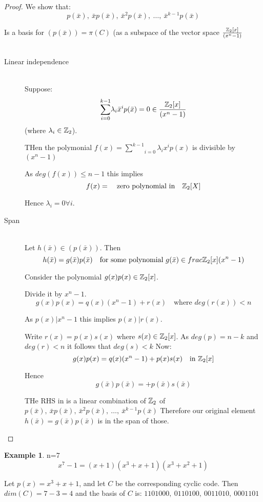 \documentclass[]{article}
\theoremstyle{definition}
\newtheorem*{exmp}{Example}
\theoremstyle{remark}
\numberwithin{equation}{section}
\begin{document}
			\begin{proof}
				We show that:
				\[
					p(\bar{x}),\ \bar{x}p(\bar{x}),\ \bar{x}^2p(\bar{x}),\ \hdots,\ \bar{x}^{k-1}p(\bar{x})
				\]

				Is a basis for $\left( p(\bar{x})\right) = \pi(C)$ (as a subspace of the vector space $\frac{\mathbb{Z}_2[x]}{(x^n-1)}$\\
				\\
				\begin{description}
					\item[Linear independence]\hfill\\
						Suppose:
						\[
							\underset{i=0}{\overset{k-1}{\sum}} \lambda_i \bar{x}^i p(\bar{x}) = 0 \in \frac{\mathbb{Z}_2[x]}{(x^n-1)}
						\]
						(where $\lambda_i \in \mathbb{Z}_2$).

						THen the polymonial $f(x) = \underset{i=0}{\overset{k-1}{\sum}} \lambda_i x^i p(x)$ is divisible by $(x^n - 1)$

						As $deg(f(x))\leq n-1$ this implies
						\[
							f(x) = \quad \text{zero polynomial in} \quad \mathbb{Z}_2[X]
						\]

						Hence $\lambda_i = 0 \forall i$.

					\item[Span]\hfill\\
						Let $h(\bar{x})  \in \left(p(\bar{x})\right)$. Then
						\[
							h(\bar{x}) = g(\bar{x})p(\bar{x}) \quad \text{for some polynomial}\ g(\bar{x}) \in frac{\mathbb{Z}_2[x]}{(x^n-1)}
						\]

						Consider the polynomial $g(x)p(x) \in \mathbb{Z}_2[x]$.

						Divide it by $x^n-1$.
						\[
						g(x)p(x)= q(x)(x^n-1)+r(x) \quad \text{where $deg(r(x))<n$}
						\]

						As $p(x) |x^n-1$ this implies $p(x) | r(x)$.

						Write $r(x) = p(x)s(x)$ where $s(x) \in \mathbb{Z}_2[x]$. As $deg(p) = n -k$ and $deg(r) < n$ it follows that $deg(s)<k$
						Now:\\
						\[
							g(x)p(x) = q(x)(x^n-1)+p(x)s(x) \quad \text{in $\mathbb{Z}_2[x]$}
						\]

						Hence
						\[
							g(\bar{x})p(\bar{x}) = + p(\bar{x})s(\bar{x})
						\]

						THe RHS in is a linear combination of $\mathbb{Z}_2$ of $p(\bar{x}),\ \bar{x}p(\bar{x}),\ \bar{x}^2p(\bar{x}),\ \hdots,\ \bar{x}^{k-1}p(\bar{x})$
						Therefore our original element $h(\bar{x})= g(\bar{x})p(\bar{x})$ is in the span of those.
				\end{description}
			\end{proof}
			\begin{exmp}n=7\hfill
			\[
				x^7-1 = (x+1)(x^3+x+1)(x^3+x^2+1)
			\]

			Let $p(x) = x^3+x+1$, and let $C$ be the corresponding cyclic code. Then $dim(C) = 7-3 = 4$
			and the basis of $C$ is: $1101000,\ 0110100,\ 0011010,\ 0001101$

			\end{exmp}
\end{document}
